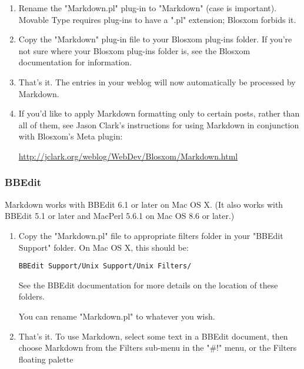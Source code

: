 \begin{enumerate}
\item 

Rename the "Markdown.pl" plug-in to "Markdown" (case is
important). Movable Type requires plug-ins to have a ".pl"
extension; Blosxom forbids it.
\item 

Copy the "Markdown" plug-in file to your Blosxom plug-ins folder.
If you're not sure where your Blosxom plug-ins folder is, see the
Blosxom documentation for information.
\item 

That's it. The entries in your weblog will now automatically be
processed by Markdown.
\item 

If you'd like to apply Markdown formatting only to certain posts,
rather than all of them, see Jason Clark's instructions for using
Markdown in conjunction with Blosxom's Meta plugin:

\href{http://jclark.org/weblog/WebDev/Blosxom/Markdown.html}{http://jclark.org/weblog/WebDev/Blosxom/Markdown.html}
\end{enumerate}


\subsubsection*{BBEdit}




Markdown works with BBEdit 6.1 or later on Mac OS X. (It also works
with BBEdit 5.1 or later and MacPerl 5.6.1 on Mac OS 8.6 or later.)

\begin{enumerate}
\item 

Copy the "Markdown.pl" file to appropriate filters folder in your
"BBEdit Support" folder. On Mac OS X, this should be:\begin{lstlisting}
BBEdit Support/Unix Support/Unix Filters/
\end{lstlisting}


See the BBEdit documentation for more details on the location of
these folders.

You can rename "Markdown.pl" to whatever you wish.
\item 

That's it. To use Markdown, select some text in a BBEdit document,
then choose Markdown from the Filters sub-menu in the "\#!" menu, or
the Filters floating palette
\end{enumerate}


